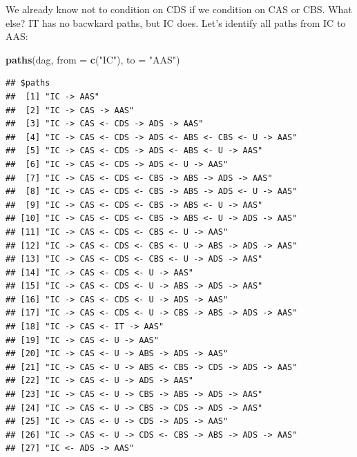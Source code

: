 \documentclass[10pt,dvipsnames,enabledeprecatedfontcommands]{scrartcl}
\newenvironment{Shaded}{\begin{snugshade}}{\end{snugshade}}
\newcommand{\DataTypeTok}[1]{\textcolor[rgb]{0.13,0.29,0.53}{#1}}
\newcommand{\KeywordTok}[1]{\textcolor[rgb]{0.13,0.29,0.53}{\textbf{#1}}}
\newcommand{\NormalTok}[1]{#1}
\newcommand{\StringTok}[1]{\textcolor[rgb]{0.31,0.60,0.02}{#1}}
\begin{document}
We already know not to condition on CDS if we condition on CAS or CBS.
What else? \textsf{IT} has no bacwkard paths, but \textsf{IC} does.
Let's identify all paths from \textsf{IC} to \textsf{AAS}:

\vspace{1mm}
\footnotesize

\begin{Shaded}
\begin{Highlighting}[]
\KeywordTok{paths}\NormalTok{(dag, }\DataTypeTok{from =} \KeywordTok{c}\NormalTok{(}\StringTok{"IC"}\NormalTok{), }\DataTypeTok{to =} \StringTok{"AAS"}\NormalTok{)}
\end{Highlighting}
\end{Shaded}

\begin{verbatim}
## $paths
##  [1] "IC -> AAS"                                              
##  [2] "IC -> CAS -> AAS"                                       
##  [3] "IC -> CAS <- CDS -> ADS -> AAS"                         
##  [4] "IC -> CAS <- CDS -> ADS <- ABS <- CBS <- U -> AAS"      
##  [5] "IC -> CAS <- CDS -> ADS <- ABS <- U -> AAS"             
##  [6] "IC -> CAS <- CDS -> ADS <- U -> AAS"                    
##  [7] "IC -> CAS <- CDS <- CBS -> ABS -> ADS -> AAS"           
##  [8] "IC -> CAS <- CDS <- CBS -> ABS -> ADS <- U -> AAS"      
##  [9] "IC -> CAS <- CDS <- CBS -> ABS <- U -> AAS"             
## [10] "IC -> CAS <- CDS <- CBS -> ABS <- U -> ADS -> AAS"      
## [11] "IC -> CAS <- CDS <- CBS <- U -> AAS"                    
## [12] "IC -> CAS <- CDS <- CBS <- U -> ABS -> ADS -> AAS"      
## [13] "IC -> CAS <- CDS <- CBS <- U -> ADS -> AAS"             
## [14] "IC -> CAS <- CDS <- U -> AAS"                           
## [15] "IC -> CAS <- CDS <- U -> ABS -> ADS -> AAS"             
## [16] "IC -> CAS <- CDS <- U -> ADS -> AAS"                    
## [17] "IC -> CAS <- CDS <- U -> CBS -> ABS -> ADS -> AAS"      
## [18] "IC -> CAS <- IT -> AAS"                                 
## [19] "IC -> CAS <- U -> AAS"                                  
## [20] "IC -> CAS <- U -> ABS -> ADS -> AAS"                    
## [21] "IC -> CAS <- U -> ABS <- CBS -> CDS -> ADS -> AAS"      
## [22] "IC -> CAS <- U -> ADS -> AAS"                           
## [23] "IC -> CAS <- U -> CBS -> ABS -> ADS -> AAS"             
## [24] "IC -> CAS <- U -> CBS -> CDS -> ADS -> AAS"             
## [25] "IC -> CAS <- U -> CDS -> ADS -> AAS"                    
## [26] "IC -> CAS <- U -> CDS <- CBS -> ABS -> ADS -> AAS"      
## [27] "IC <- ADS -> AAS"                                       

\end{verbatim}
\end{document}
